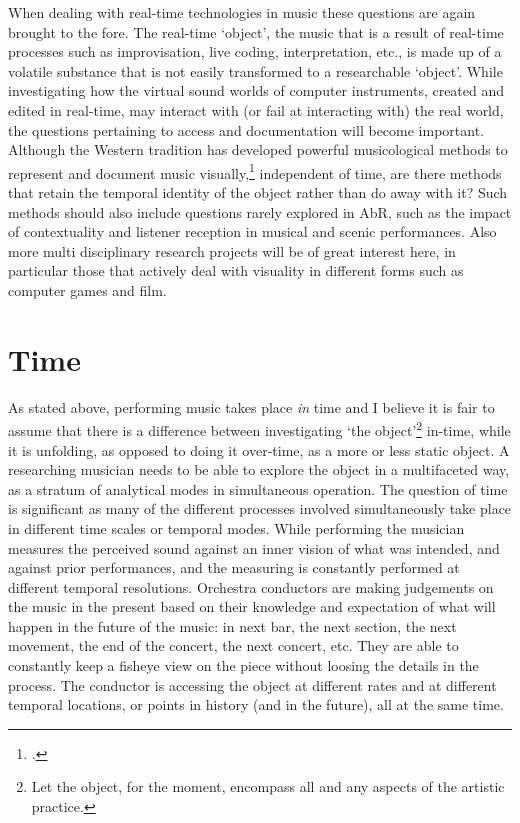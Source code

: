 
When dealing with real-time technologies in music these questions are again brought to the fore. The real-time `object', the music that is a result of real-time processes such as improvisation, live coding, interpretation, etc., is made up of a volatile substance that is not easily transformed to a researchable `object'. While investigating how the virtual sound worlds of computer instruments, created and edited in real-time, may interact with (or fail at interacting with) the real world, the questions pertaining to access and documentation will become important. 
Although the Western tradition has developed powerful musicological methods to represent and document music visually,\footcite[See]{bregman94} independent of time, are there methods that retain the temporal identity of the object rather than do away with it? Such methods should also include questions rarely explored in AbR, such as the impact of contextuality and listener reception in musical and scenic performances. Also more multi disciplinary research projects will be of great interest here, in particular those that actively deal with visuality in different forms such as computer games and film. 

\section*{Time}
\label{sec:performing-time}

As stated above, performing music takes place \emph{in} time and I believe it is fair to assume that there is a difference between investigating `the object'\footnote{Let the object, for the moment, encompass all and any aspects of the artistic practice.} in-time, while it is unfolding, as opposed to doing it over-time, as a more or less static object. A researching musician needs to be able to explore the object in a multifaceted way, as a stratum of analytical modes in simultaneous operation. The question of time is significant as  
many of the different processes involved simultaneously take place in  different time scales or temporal modes. While performing the musician measures the perceived sound against an inner vision of what was intended, and against prior performances, and the measuring is constantly performed at different temporal resolutions. Orchestra conductors are making judgements on the music in the present based on their knowledge and expectation of what will happen in the future of the music: in next bar, the next section, the next movement, the end of the concert, the next concert, etc. They are able to constantly keep a fisheye view on the piece without loosing the details in the process. The conductor is accessing the object at different rates and at different temporal locations, or points in history (and in the future), all at the same time. 

